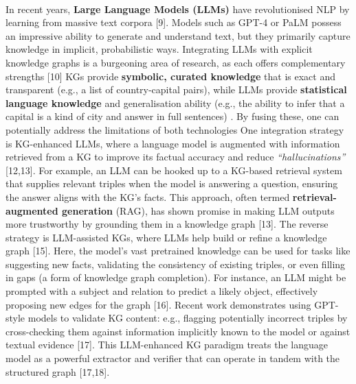                 \paragraph{}
        In recent years, \textbf{Large Language Models (LLMs)} have revolutionised NLP by learning from massive text corpora [9]. Models such as GPT-4 or PaLM possess an impressive ability to generate and understand text, but they primarily capture knowledge in implicit, probabilistic ways. Integrating LLMs with explicit knowledge graphs is a burgeoning area of research, as each offers complementary strengths [10] KGs provide \textbf{symbolic, curated knowledge} that is exact and transparent (e.g., a list of country-capital pairs), while LLMs provide \textbf{statistical language knowledge} and generalisation ability (e.g., the ability to infer that a capital is a kind of city and answer in full sentences) . By fusing these, one can potentially address the limitations of both technologies  One integration strategy is KG-enhanced LLMs, where a language model is augmented with information retrieved from a KG to improve its factual accuracy and reduce \textit{“hallucinations”} [12,13]. For example, an LLM can be hooked up to a KG-based retrieval system that supplies relevant triples when the model is answering a question, ensuring the answer aligns with the KG’s facts. This approach, often termed \textbf{retrieval-augmented generation} (RAG), has shown promise in making LLM outputs more trustworthy by grounding them in a knowledge graph [13]. The reverse strategy is LLM-assisted KGs, where LLMs help build or refine a knowledge graph [15]. Here, the model’s vast pretrained knowledge can be used for tasks like suggesting new facts, validating the consistency of existing triples, or even filling in gaps (a form of knowledge graph completion). For instance, an LLM might be prompted with a subject and relation to predict a likely object, effectively proposing new edges for the graph [16]. Recent work demonstrates using GPT-style models to validate KG content: e.g., flagging potentially incorrect triples by cross-checking them against information implicitly known to the model or against textual evidence [17]. This LLM-enhanced KG paradigm treats the language model as a powerful extractor and verifier that can operate in tandem with the structured graph [17,18].
        \newpage
